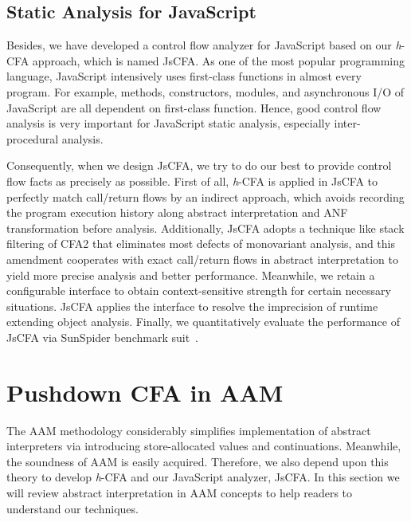 \documentclass{article}
\begin{document}
\subsection{Static Analysis for JavaScript}
\label{sub:Static Analysis for JavaScript}
Besides, we have developed a control flow analyzer for JavaScript based on our \textit{h}-CFA approach, which is named JsCFA\@.
As one of the most popular programming language, JavaScript intensively uses first-class functions in almost every program.
For example, methods, constructors, modules, and asynchronous I/O of JavaScript are all dependent on first-class function.
Hence, good control flow analysis is very important for JavaScript static analysis, especially inter-procedural analysis.

Consequently, when we design JsCFA, we try to do our best to provide control flow facts as precisely as possible.
First of all, \textit{h}-CFA is applied in JsCFA to perfectly match call/return flows by an indirect approach, which avoids recording the program execution history along abstract interpretation and ANF transformation before analysis.
Additionally, JsCFA adopts a technique like stack filtering of CFA2 that eliminates most defects of monovariant analysis, and this amendment cooperates with exact call/return flows in abstract interpretation to yield more precise analysis and better performance.
Meanwhile, we retain a configurable interface to obtain context-sensitive strength for certain necessary situations.
JsCFA applies the interface to resolve the imprecision of runtime extending object analysis. Finally, we quantitatively evaluate the performance of JsCFA via SunSpider benchmark suit~\cite{sunspider}.

\section{Pushdown CFA in AAM}
\label{sec:PushdownAAM}
The AAM methodology considerably simplifies implementation of abstract interpreters via introducing store-allocated values and continuations.
Meanwhile, the soundness of AAM is easily acquired.
Therefore, we also depend upon this theory to develop \textit{h}-CFA and our JavaScript analyzer, JsCFA\@.
In this section we will review abstract interpretation in AAM concepts to help readers to understand our techniques.
\end{document}
